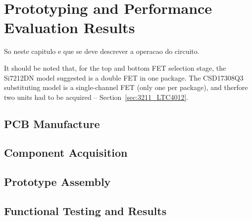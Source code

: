 

\chapter{Prototyping and Performance Evaluation Results}\label{cha:chapter4_PrototypingPerf}

So neste capitulo e que se deve descrever a operacao do circuito.

It should be noted that, for the top and bottom FET selection stage, the Si7212DN model suggested is a double FET in one package. The CSD17308Q3 substituting model is a single-channel FET (only one per package), and therfore two units had to be acquired -- Section~\ref{sec:3211_LTC4012}.

\section{PCB Manufacture}\label{sec:41_PCBmanufacture}

\section{Component Acquisition}\label{sec:42_ComponentAcquisition}

\section{Prototype Assembly}\label{sec:43_PrototypeAssembly}

\section{Functional Testing and Results}\label{sec:44_FunctionalTesting}
